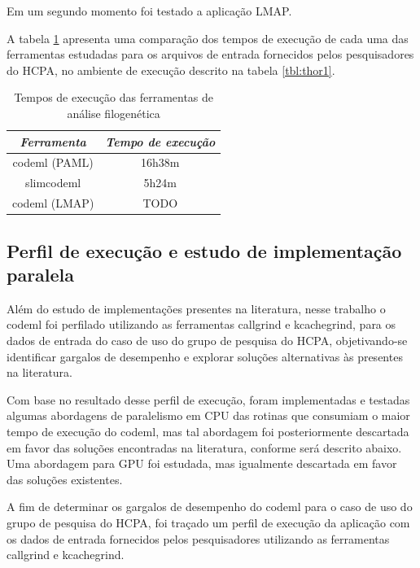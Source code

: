 \documentclass[cic,tc]{iiufrgs}
\begin{document}
Em um segundo momento foi testado a aplicação LMAP.\cite{maldonado2016lmap}

A tabela \ref{tbl:paml} apresenta uma comparação dos tempos de execução de cada
uma das ferramentas estudadas para os arquivos de entrada fornecidos pelos
pesquisadores do HCPA, no ambiente de execução descrito na tabela \ref{tbl:thor1}.

\begin{table}[h]
    \caption{Tempos de execução das ferramentas de análise filogenética}
    \centering
        \begin{tabular}{c|c}
          \hline
          \textit{Ferramenta}  &   \textit{Tempo de execução} \\
          \hline
          \hline
          codeml (PAML) & 16h38m \\
          slimcodeml & 5h24m \\
          codeml (LMAP) & TODO \\
          \hline
        \end{tabular}
    \label{tbl:paml}
\end{table}

\subsection{Perfil de execução e estudo de implementação paralela}
\label{subsec:codemlpar}

Além do estudo de implementações presentes na literatura, nesse trabalho o
codeml foi perfilado utilizando as ferramentas callgrind e
kcachegrind,\cite{weidendorfer2008sequential} para os dados de entrada do caso
de uso do grupo de pesquisa do HCPA, objetivando-se identificar gargalos de
desempenho e explorar soluções alternativas às presentes na literatura.

Com base no resultado desse perfil de execução, foram implementadas e testadas
algumas abordagens de paralelismo em CPU das rotinas que consumiam o maior
tempo de execução do codeml, mas tal abordagem foi posteriormente descartada em
favor das soluções encontradas na literatura, conforme será descrito abaixo.
Uma abordagem para GPU foi estudada, mas igualmente descartada em favor das
soluções existentes.

A fim de determinar os gargalos de desempenho do codeml para o caso de uso do
grupo de pesquisa do HCPA, foi traçado um perfil de execução da aplicação com
os dados de entrada fornecidos pelos pesquisadores utilizando as
ferramentas callgrind e kcachegrind.\cite{weidendorfer2008sequential}
\end{document}
